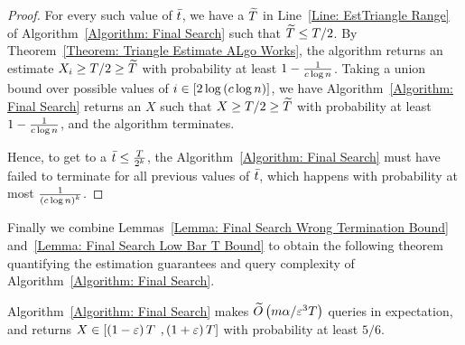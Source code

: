 \begin{proof}
    For every such value of $\bar{t} $, we have a $\widetilde{T}$ in Line~\ref{Line: EstTriangle Range} of Algorithm~\ref{Algorithm: Final Search} such that $\widetilde{T} \leq T/2$. By Theorem~\ref{Theorem: Triangle Estimate ALgo Works}, the algorithm returns an estimate $X_i \geq T/2 \geq \widetilde{T}$ with probability at least $1 - \frac{1}{c\log n}$. Taking a union bound over possible values of $i \in \left[{2\log \left({c\log n}\right)}\right]$, we have Algorithm~\ref{Algorithm: Final Search} returns an $X$ such that $X \geq T/2 \geq \widetilde{T}$ with probability at least $1 - \frac{1}{c\log n}$, and the algorithm terminates.

    
    Hence, to get to a $\bar{t}  \leq \frac{T}{2^k}$, the Algorithm~\ref{Algorithm: Final Search} must have failed to terminate for all previous values of $\bar{t} $, which happens with probability at most $\frac{1}{\left({c\log n}\right)^k}$.
\end{proof}

Finally we combine Lemmas~\ref{Lemma: Final Search Wrong Termination Bound} and~\ref{Lemma: Final Search Low Bar T Bound} to obtain the following theorem quantifying the estimation guarantees and query complexity of Algorithm~\ref{Algorithm: Final Search}.

\begin{theorem}
    Algorithm~\ref{Algorithm: Final Search} makes $\widetilde{O}\left({{m\alpha/\varepsilon^3T}}\right)$ queries in expectation, and returns $X \in [\left({1-\varepsilon}\right)T$ $,\left({1+\varepsilon}\right)T]$ with probability at least $5/6$.
\end{theorem}

